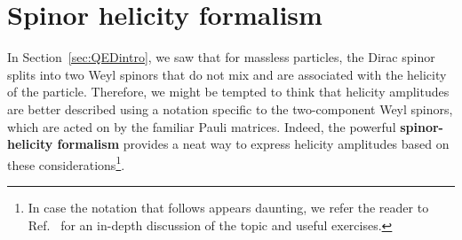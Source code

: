 \documentclass[main.tex]{subfiles}
\begin{document}
\section{Spinor helicity formalism} \label{sec:spinhelform}
In Section~\ref{sec:QEDintro}, we saw that for massless particles, the Dirac spinor splits into two Weyl spinors that do not mix and are associated with the helicity of the particle. Therefore, we might be tempted to think that helicity amplitudes are better described using a notation specific to the two-component Weyl spinors, which are acted on by the familiar Pauli matrices. Indeed, the powerful \textbf{spinor-helicity formalism} provides a neat way to express helicity amplitudes based on these considerations\footnote{In case the notation that follows appears daunting, we refer the reader to Ref.~\cite{ElvangHuang} for an in-depth discussion of the topic and useful exercises.}.
\end{document}
